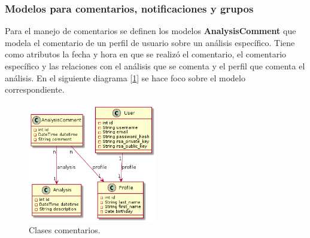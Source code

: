 \subsubsection{Modelos para comentarios, notificaciones y grupos}

Para el manejo de comentarios se definen los modelos \textbf{AnalysisComment} que modela el comentario de un perfil de usuario sobre un análisis específico. Tiene como atributos la fecha y hora en que se realizó el comentario, el comentario específico y las relaciones con el análisis que se comenta y el perfil que comenta el análisis. En el siguiente diagrama [\ref{9-comentario_análisis}] se hace foco sobre el modelo correspondiente.

	\begin{figure}[h]
        \centering
        \includegraphics[width=0.5\textwidth]{img/dc_coment}
        \caption{Clases comentarios.}
		\label{9-comentario_análisis}
    \end{figure}

